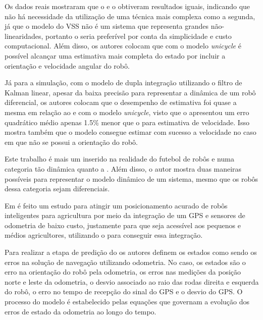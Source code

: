 \documentclass[acronym, symbols, table, deposito]{fei}
\begin{document}
Os dados reais mostraram que o  e o  obtiveram resultados iguais, indicando que não há necessidade da utilização de uma técnica mais complexa como a segunda, já que o modelo do VSS não é um sistema que representa grandes não-linearidades, portanto o  seria preferível por conta da simplicidade e custo computacional. Além disso, os autores colocam que com o modelo \textit{unicycle} é possível alcançar uma estimativa mais completa do estado por incluir a orientação e velocidade angular do robô.

Já para a simulação, com o modelo de dupla integração utilizando o filtro de Kalman linear, apesar da baixa precisão para representar a dinâmica de um robô diferencial, os autores colocam que o desempenho de estimativa foi quase a mesma em relação ao  e  com o modelo \textit{unicycle}, visto que o  apresentou um erro quadrático médio apenas 1.5\% menor que o  para estimativa de velocidade. Isso mostra também que o modelo consegue estimar com sucesso a velocidade no caso em que não se possui a orientação do robô.

Este trabalho é mais um inserido na realidade do futebol de robôs e numa categoria tão dinâmica quanto a . Além disso, o autor mostra duas maneiras possíveis para representar o modelo dinâmico de um sistema, mesmo que os robôs dessa categoria sejam diferenciais.


Em \textcite{10333060} é feito um estudo para atingir um posicionamento acurado de robôs inteligentes para agricultura por meio da integração de um GPS e sensores de odometria de baixo custo, justamente para que seja acessível aos pequenos e médios agricultores, utilizando o  para conseguir essa integração.

Para realizar a etapa de predição do  os autores definem os estados como sendo os erros na solução de navegação utilizando odometria. No caso, os estados são o erro na orientação do robô pela odometria, os erros nas medições da posição norte e leste da odometria, o desvio associado ao raio das rodas direita e esquerda do robô, o erro no tempo de recepção do sinal do GPS e o desvio do GPS. O processo do modelo é estabelecido pelas equações que governam a evolução dos erros de estado da odometria ao longo do tempo.
\end{document}
